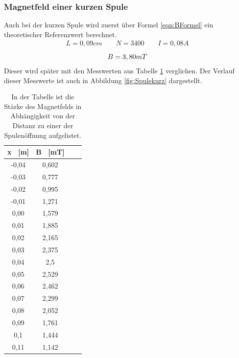 \documentclass[titlepage = firstcover]{scrartcl}
\begin{document}
            \subsubsection{Magnetfeld einer kurzen Spule}
                Auch bei der kurzen Spule wird zuerst über Formel \ref{eqn:BFormel} ein theoretischer Referenzwert berechnet.
                \begin{align*}
                    L = 0,09cm \qquad N = 3400 \qquad I = 0,08A 
                \end{align*}
                \begin{equation}
                    B = 3,80 mT \\
                    \label{eqn:Bkurz}
                \end{equation} 
                Dieser wird später mit den Messwerten aus Tabelle \ref{tab:Spulekurz} verglichen. Der Verlauf dieser Messwerte ist auch in Abbildung 
                \ref{fig:Spulekurz} dargestellt.
                \begin{table}[h]
                    \centering 
                    \caption{In der Tabelle ist die Stärke des Magnetfelds in Abhängigkeit von der Distanz zu einer der Spulenöffnung aufgelistet.}
                    \label{tab:Spulekurz}
    
                    \begin{tabular}{c c c c}
                        \toprule
                        {x \ [m]} & {B \ [mT]} \\
                        \midrule
                        -0,04 & 0,602 \\
                        -0,03 & 0,777 \\
                        -0,02 & 0,995 \\
                        -0,01 & 1,271 \\
                         0,00 & 1,579 \\
                         0,01 & 1,885 \\
                         0,02 & 2,165 \\
                         0,03 & 2,375 \\
                         0,04 & 2,5   \\
                         0,05 & 2,529 \\
                         0,06 & 2,462 \\
                         0,07 & 2,299 \\
                         0,08 & 2,052 \\
                         0,09 & 1,761 \\
                         0,1  & 1,444 \\
                         0,11 & 1,142 \\
                        \bottomrule
                    \end{tabular}                
                \end{table}
    
\end{document}
